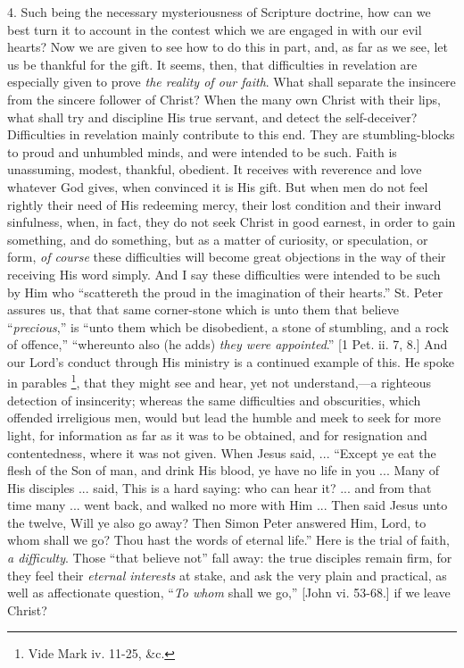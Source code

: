 4. Such being the necessary mysteriousness of
Scripture doctrine, how can we best turn it to account in
the contest which we are engaged in with our evil hearts?
Now we are given to see how to do this in part, and, as
far as we see, let us be thankful for the gift. It seems,
then, that difficulties in revelation are especially
given to prove \emph{the reality of our faith}. What
shall separate the insincere from the sincere follower of
Christ? When the many own Christ with their lips, what
shall try and discipline His true servant, and detect the
self-deceiver? Difficulties in revelation mainly
contribute to this end. They are stumbling-blocks to
proud and unhumbled minds, and were intended to be such.
Faith is unassuming, modest, thankful, obedient. It
receives with reverence and love whatever God gives, when
convinced it is His gift. But when men do not feel
rightly their need of His redeeming mercy, their lost
condition and their inward sinfulness, when, in fact,
they do not seek Christ in good earnest, in order to gain
something, and do something, but as a matter of
curiosity, or speculation, or form, \emph{of course}
these difficulties will become great objections in the
way of their receiving His word simply. And I say these
difficulties were intended to be such by Him who
``scattereth the proud in the imagination of their
hearts.'' St. Peter assures us, that that same
corner-stone which is unto them that believe ``\emph{precious},''
is ``unto them which be disobedient, a stone of
stumbling, and a rock of offence,'' ``whereunto
also (he adds) \emph{they were appointed}.'' [1
Pet. ii. 7, 8.] And our Lord's conduct through His
ministry is a continued example of this. He spoke in
parables \footnote{Vide Mark iv. 11-25, \&c.}, that they might
see and hear, yet not understand,—a righteous
detection of insincerity; whereas the same difficulties
and obscurities, which offended irreligious men, would
but lead the humble and meek to seek for more light, for
information as far as it was to be obtained, and for
resignation and contentedness, where it was not given.
When Jesus said, ... ``Except ye eat the flesh of the
Son of man, and drink His blood, ye have no life in you
... Many of His disciples ... said, This is a hard
saying: who can hear it? ... and from that time many ...
went back, and walked no more with Him ... Then said
Jesus unto the twelve, Will ye also go away? Then Simon
Peter answered Him, Lord, to whom shall we go? Thou hast
the words of eternal life.'' Here is the trial of
faith, \emph{a difficulty}. Those ``that believe
not'' fall away: the true disciples remain firm, for
they feel their \emph{eternal interests} at stake, and
ask the very plain and practical, as well as affectionate
question, ``\emph{To whom} shall we go,'' [John
vi. 53-68.] if we leave Christ?


